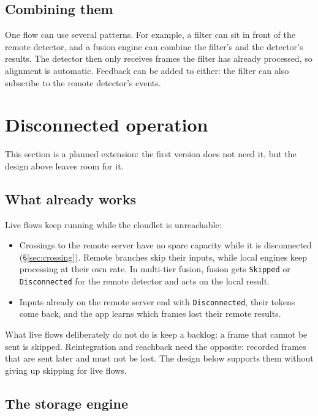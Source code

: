 \documentclass[11pt]{article}
\newcommand{\code}[1]{\texttt{#1}}
\begin{document}
\subsection{Combining them}

One flow can use several patterns. For example, a filter can sit in front of
the remote detector, and a fusion engine can combine the filter's and the
detector's results. The detector then only receives frames the filter has
already processed, so alignment is automatic. Feedback can be added to either:
the filter can also subscribe to the remote detector's events.

\section{Disconnected operation}
\label{sec:disconnected}

This section is a planned extension: the first version does not need it, but
the design above leaves room for it.

\subsection{What already works}

Live flows keep running while the cloudlet is unreachable:
\begin{itemize}[nosep]
  \item Crossings to the remote server have no spare capacity while it is
        disconnected (\S\ref{sec:crossing}). Remote branches skip their
        inputs, while local engines keep processing at their own rate. In
        multi-tier fusion, fusion gets \code{Skipped} or \code{Disconnected}
        for the remote detector and acts on the local result.
  \item Inputs already on the remote server end with \code{Disconnected},
        their tokens come back, and the app learns which frames lost their
        remote results.
\end{itemize}
What live flows deliberately do not do is keep a backlog: a frame that cannot
be sent is skipped. Reintegration and reachback need the opposite: recorded
frames that are sent later and must not be lost. The design below supports
them without giving up skipping for live flows.

\subsection{The storage engine}
\end{document}
